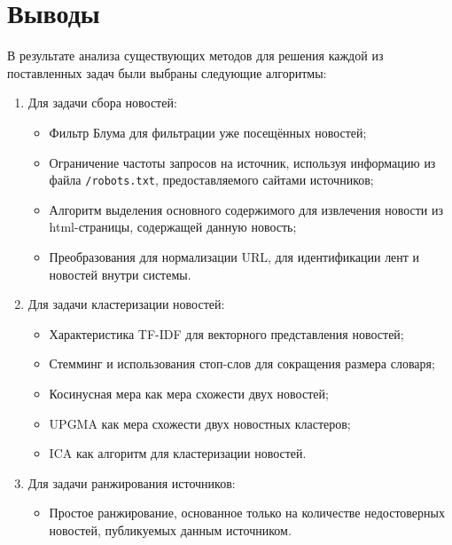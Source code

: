 \section{Выводы}
В результате анализа существующих методов для решения каждой из поставленных задач были выбраны следующие алгоритмы:
\begin{enumerate}
    \item Для задачи сбора новостей:
        \begin{itemize}
            \item Фильтр Блума для фильтрации уже посещённых новостей;
            \item Ограничение частоты запросов на источник, используя информацию из файла \verb|/robots.txt|, предоставляемого сайтами источников;
            \item Алгоритм выделения основного содержимого для извлечения новости из html-страницы, содержащей данную новость;
            \item Преобразования для нормализации URL, для идентификации лент и новостей внутри системы.
        \end{itemize}
    \item Для задачи кластеризации новостей:
        \begin{itemize}
            \item Характеристика TF-IDF для векторного представления новостей;
            \item Стемминг и использования стоп-слов для сокращения размера словаря;
            \item Косинусная мера как мера схожести двух новостей;
            \item UPGMA как мера схожести двух новостных кластеров;
            \item ICA как алгоритм для кластеризации новостей.
        \end{itemize}
    \item Для задачи ранжирования источников:
        \begin{itemize}
            \item Простое ранжирование, основанное только на количестве недостоверных новостей, публикуемых данным источником.
        \end{itemize}
\end{enumerate}
